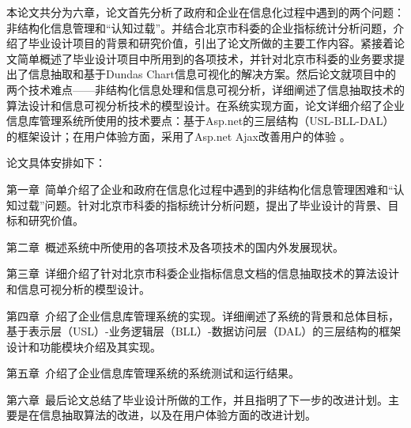 
本论文共分为六章，论文首先分析了政府和企业在信息化过程中遇到的两个问题：非结构化信息管理和“认知过载”。并结合北京市科委的企业指标统计分析问题，介绍了毕业设计项目的背景和研究价值，引出了论文所做的主要工作内容。紧接着论文简单概述了毕业设计项目中所用到的各项技术，并针对北京市科委的业务要求提出了信息抽取和基于Dundas Chart信息可视化的解决方案。然后论文就项目中的两个技术难点——非结构化信息处理和信息可视分析，详细阐述了信息抽取技术的算法设计和信息可视分析技术的模型设计。在系统实现方面，论文详细介绍了企业信息库管理系统所使用的技术要点：基于Asp.net的三层结构（USL-BLL-DAL）的框架设计；在用户体验方面，采用了Asp.net Ajax改善用户的体验 \cite{ll-soidc}。

论文具体安排如下：

第一章\ 简单介绍了企业和政府在信息化过程中遇到的非结构化信息管理困难和“认知过载”问题。针对北京市科委的指标统计分析问题，提出了毕业设计的背景、目标和研究价值。

第二章\ 概述系统中所使用的各项技术及各项技术的国内外发展现状。

第三章\ 详细介绍了针对北京市科委企业指标信息文档的信息抽取技术的算法设计和信息可视分析的模型设计。

第四章\ 介绍了企业信息库管理系统的实现。详细阐述了系统的背景和总体目标，基于表示层（USL）-业务逻辑层（BLL）-数据访问层（DAL）的三层结构的框架设计和功能模块介绍及其实现。

第五章\ 介绍了企业信息库管理系统的系统测试和运行结果。

第六章\ 最后论文总结了毕业设计所做的工作，并且指明了下一步的改进计划。主要是在信息抽取算法的改进，以及在用户体验方面的改进计划。
